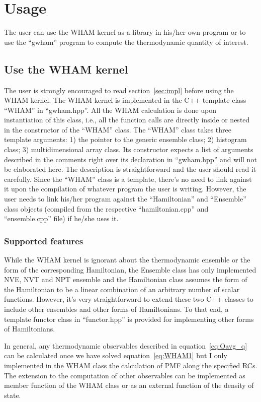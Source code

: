 \section{Usage} \label{sec:usage}
The user can use the WHAM kernel as a library in his/her own
program or to use the ``gwham'' program to compute the thermodynamic
quantity of interest. 

\subsection{Use the WHAM kernel}
The user is strongly encouraged to read section~\ref{sec:impl} before using the
WHAM kernel. The WHAM kernel is implemented in the C++ template class ``WHAM''
in ``gwham.hpp''. All the WHAM calculation is done upon instantiation of this
class, i.e., all the function calls are directly inside or nested in the
constructor of the ``WHAM'' class. The ``WHAM'' class takes three template
arguments: 1) the pointer to the generic ensemble class; 2) histogram class; 3)
multidimensional array class. Its constructor expects a list of arguments
described in the comments right over its declaration in ``gwham.hpp'' and will
not be elaborated here. The description is straightforward and the user should
read it carefully. Since the ``WHAM'' class is a template, there's no need to 
link against it upon the compilation of whatever program the user is writing. 
However, the user needs to link his/her program against the ``Hamiltonian'' 
and ``Ensemble'' class objects (compiled from the respective ``hamiltonian.cpp''
and ``ensemble.cpp'' file) if he/she uses it.

\subsubsection{Supported features}
While the WHAM kernel is ignorant about the thermodynamic ensemble or the form
of the corresponding Hamiltonian, the Ensemble class has only implemented NVE,
NVT and NPT ensemble and the Hamiltonian class assumes the form of the
Hamiltonian to be a linear combination of an arbitrary number of scalar
functions. However, it's very straightforward to extend these two C++ classes 
to include other ensembles and other forms of Hamiltonians. To that end, a 
template functor class in ``functor.hpp'' is provided for implementing other 
forms of Hamiltonians. 

In general, any thermodynamic observables described in equation~\ref{eq:Oavg_q}
can be calculated once we have solved equation~\ref{eq:WHAM1} but I only 
implemented in the WHAM class the calculation of PMF along the specified RCs.
The extension to the computation of other observables can be implemented as 
member function of the WHAM class or as an external function of the density 
of state.

